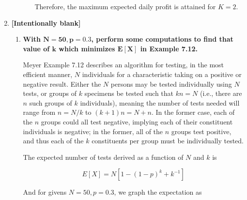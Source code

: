 \documentclass[10pt, oneside]{article}   	%
\theoremstyle{definition}
\begin{document}
\begin{enumerate}[label=7.\arabic*]
\begin{enumerate}
\begin{enumerate}
		Therefore, the maximum expected daily profit is attained for $\boxed{K = 2}$.
		
		\end{enumerate}
	
	\end{enumerate}

\item  \begin{tcolorbox}[
  colback=Cerulean!5!white,
  colframe=Cerulean!75!black]
  \textbf{[Intentionally blank]}
\end{tcolorbox}

	\begin{enumerate}
	\item  \begin{tcolorbox}[
	  colback=Cerulean!5!white,
	  colframe=Cerulean!75!black]
	\textbf{With $\bm{N = 50, p = 0.3}$, perform some computations to find that value of $\bm{k}$ which minimizes $\bm{E[X]}$ in Example 7.12.}
	\end{tcolorbox}
	
	Meyer Example 7.12 describes an algorithm for testing, in the most efficient manner, $N$ individuals for a characteristic taking on a positive or negative result. Either the $N$ persons may be tested individually using $N$ tests, or groups of $k$ specimens be tested such that $kn = N$ (i.e., there are $n$ such groups of $k$ individuals), meaning the number of tests needed will range from $n = N/k$ to $(k + 1)n = N + n$. In the former case, each of the $n$ groups could all test negative, implying each of their constituent individuals is negative; in the former, all of the $n$ groups test positive, and thus each of the $k$ constituents per group must be individually tested.
	
	The expected number of tests derived as a function of $N$ and $k$ is
	
	\[ E[X] = N [1 - (1-p)^k + k^{-1}] \]
	
	And for givens $N = 50, p = 0.3$, we graph the expectation as
	

\end{enumerate}
\end{enumerate}
\end{document}
